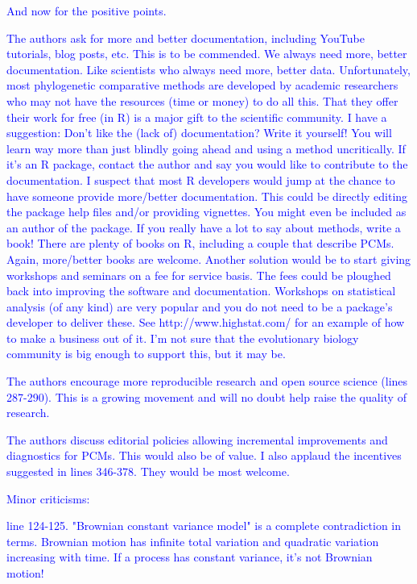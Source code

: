 \documentclass[12pt]{letter}
\begin{document}
\begin{letter}{}
\textcolor{blue}{And now for the positive points.}

\textcolor{blue}{The authors ask for more and better documentation, including YouTube tutorials, blog posts, etc. This is to be commended. We always need more, better documentation. Like scientists who always need more, better data. Unfortunately, most phylogenetic comparative methods are developed by academic researchers who may not have the resources (time or money) to do all this. That they offer their work for free (in R) is a major gift to the scientific community. I have a suggestion: Don't like the (lack of) documentation? Write it yourself! You will learn way more than just blindly going ahead and using a method uncritically. If it's an R package, contact the author and say you would like to contribute to the documentation. I suspect that most R developers would jump at the chance to have someone provide more/better documentation. This could be directly editing the package help files and/or providing vignettes. You  might even be included as an author of the package. If you really have a lot to say about methods, write a book! There are plenty of books on R, including a couple that describe PCMs. Again, more/better books are welcome. Another solution would be to start giving workshops and seminars on a fee for service basis. The fees could be ploughed back into improving the software and documentation. Workshops on statistical analysis (of any kind) are very popular and you do not need to be a package's developer to deliver these. See  http://www.highstat.com/ for an example of how to make a business out of it. I'm not sure that the evolutionary biology community is big enough to support this, but it may be.}

\textcolor{blue}{The authors encourage more reproducible research and open source science (lines 287-290). This is a growing movement and will no doubt help raise the quality of research.}

\textcolor{blue}{The authors discuss editorial policies allowing incremental improvements and diagnostics for PCMs. This would also be of value. I also applaud the incentives suggested in lines 346-378. They would be most welcome.}

\textcolor{blue}{Minor criticisms:}

\textcolor{blue}{line 124-125. "Brownian constant variance model" is a complete contradiction in terms. Brownian motion has infinite total variation and quadratic variation increasing with time. If a process has constant variance, it's not Brownian motion!}


\end{letter}
\end{document}
